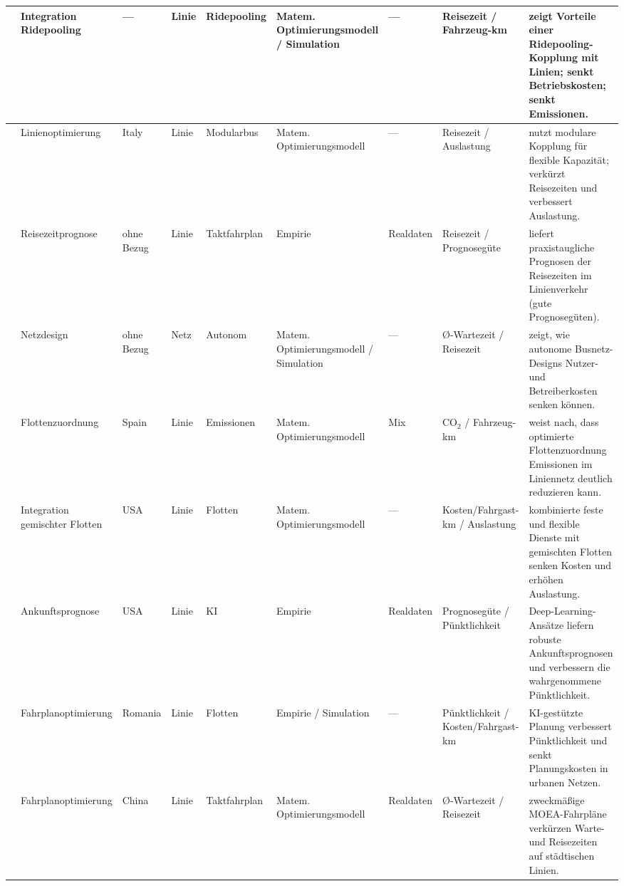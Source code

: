 \begin{landscape}
\begin{table}[p]
{\begin{tabular}{
        L{2.0cm}:
        L{2.5cm}:
        L{2.0cm}:
        L{2.0cm}:
        L{2.5cm}:
        L{2.3cm}:
        L{1.8cm}:
        L{2.6cm}:
        L{7.4cm}:
    }
      \textcite{fielbaum_improving_2024} & Integration Ridepooling & — & Linie & Ridepooling & Matem. Optimierungsmodell / Simulation & — & Reisezeit / Fahrzeug-km & zeigt Vorteile einer Ridepooling-Kopplung mit Linien; senkt Betriebskosten; senkt Emissionen. \\ \hline
      \textcite{filippi_exploiting_2024} & Linienoptimierung & Italy & Linie & Modularbus & Matem. Optimierungsmodell & — & Reisezeit / Auslastung & nutzt modulare Kopplung für flexible Kapazität; verkürzt Reisezeiten und verbessert Auslastung. \\ \hline
      \textcite{gal_traveling_2017} & Reisezeitprognose & ohne Bezug & Linie & Taktfahrplan & Empirie & Realdaten & Reisezeit / Prognosegüte & liefert praxistaugliche Prognosen der Reisezeiten im Linienverkehr (gute Prognosegüten). \\ \hline
      \textcite{hatzenbuhler_network_2022} & Netzdesign & ohne Bezug & Netz & Autonom & Matem. Optimierungsmodell / Simulation & — & Ø-Wartezeit / Reisezeit & zeigt, wie autonome Busnetz-Designs Nutzer- und Betreiberkosten senken können. \\ \hline
      \textcite{jimenez_urban_2016} & Flottenzuordnung & Spain & Linie & Emissionen & Matem. Optimierungsmodell & Mix & CO\(_2\) / Fahrzeug-km & weist nach, dass optimierte Flottenzuordnung Emissionen im Liniennetz deutlich reduzieren kann. \\ \hline
      \textcite{kim_integrating_2013} & Integration gemischter Flotten & USA & Linie & Flotten & Matem. Optimierungsmodell & — & Kosten/Fahrgast-km / Auslastung & kombinierte feste und flexible Dienste mit gemischten Flotten senken Kosten und erhöhen Auslastung. \\ \hline
      \textcite{rashvand_real-time_2024} & Ankunftsprognose & USA & Linie & KI & Empirie & Realdaten & Prognosegüte / Pünktlichkeit & Deep-Learning-Ansätze liefern robuste Ankunftsprognosen und verbessern die wahrgenommene Pünktlichkeit. \\ \hline
      \textcite{rosca_designing_2024} & Fahrplanoptimierung & Romania & Linie & Flotten & Empirie / Simulation & — & Pünktlichkeit / Kosten/Fahrgast-km & KI-gestützte Planung verbessert Pünktlichkeit und senkt Planungskosten in urbanen Netzen. \\ \hline
      \textcite{tang_data-driven_2021} & Fahrplanoptimierung & China & Linie & Taktfahrplan & Matem. Optimierungsmodell & Realdaten & Ø-Wartezeit / Reisezeit & zweckmäßige MOEA-Fahrpläne verkürzen Warte- und Reisezeiten auf städtischen Linien. \\ \hline

\end{tabular}}
\end{table}
\end{landscape}
